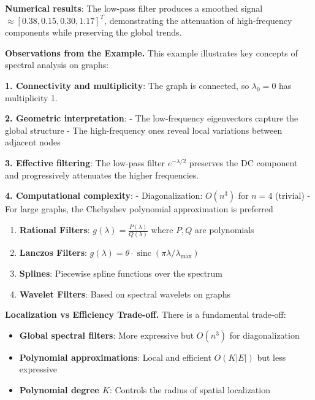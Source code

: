\textbf{Numerical results}:
The low-pass filter produces a smoothed signal $\approx [0.38, 0.15, 0.30, 1.17]^T$, demonstrating the attenuation of high-frequency components while preserving the global trends.

\textbf{Observations from the Example.} This example illustrates key concepts of spectral analysis on graphs:

\textbf{1. Connectivity and multiplicity}:
The graph is connected, so $\lambda_0 = 0$ has multiplicity 1.

\textbf{2. Geometric interpretation}:
- The low-frequency eigenvectors capture the global structure
- The high-frequency ones reveal local variations between adjacent nodes

\textbf{3. Effective filtering}:
The low-pass filter $e^{-\lambda/2}$ preserves the DC component and progressively attenuates the higher frequencies.

\textbf{4. Computational complexity}:
- Diagonalization: $O(n^3)$ for $n = 4$ (trivial)
- For large graphs, the Chebyshev polynomial approximation is preferred

\begin{example}\label{ex:otros_filtros_espectrales}
\leavevmode
\begin{enumerate}
    \item \textbf{Rational Filters}: $g(\lambda) = \frac{P(\lambda)}{Q(\lambda)}$ where $P, Q$ are polynomials
    \item \textbf{Lanczos Filters}: $g(\lambda) = \theta \cdot \operatorname{sinc}(\pi\lambda/\lambda_{\max})$
    \item \textbf{Splines}: Piecewise spline functions over the spectrum
    \item \textbf{Wavelet Filters}: Based on spectral wavelets on graphs
\end{enumerate}
\end{example}

\textbf{Localization vs Efficiency Trade-off.} There is a fundamental trade-off:
\begin{itemize}
    \item \textbf{Global spectral filters}: More expressive but $O(n^3)$ for diagonalization
    \item \textbf{Polynomial approximations}: Local and efficient $O(K|E|)$ but less expressive
    \item \textbf{Polynomial degree $K$}: Controls the radius of spatial localization
\end{itemize}

